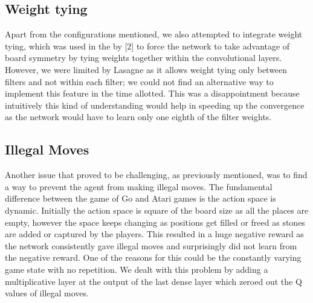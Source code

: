 \subsection{Weight tying}
Apart from the configurations mentioned, we also attempted to integrate weight tying, which was used in the by [2] to force the network to take advantage of board symmetry by tying weights together within the convolutional layers. However, we were limited by Lasagne as it allows weight tying only between filters and not within each filter; we could not find an alternative way to implement this feature in the time allotted. This was a disappointment because intuitively this kind of understanding would help in speeding up the convergence as the network would have to learn only one eighth of the filter weights. 

\subsection{Illegal Moves}
Another issue that proved to be challenging, as previously mentioned, was to find a way to prevent the agent from making illegal moves. The fundamental difference between the game of Go and Atari games is the action space is dynamic. Initially the action space is square of the board size as all the places are empty, however the space keeps changing as positions get filled or freed as stones are added or captured by the players. This resulted in a huge negative reward as the network consistently gave illegal moves and surprisingly did not learn from the negative reward. One of the reasons for this could be the constantly varying game state with no repetition. We dealt with this problem by adding a multiplicative layer at the output of the last dense layer which zeroed out the Q values of illegal moves.  

